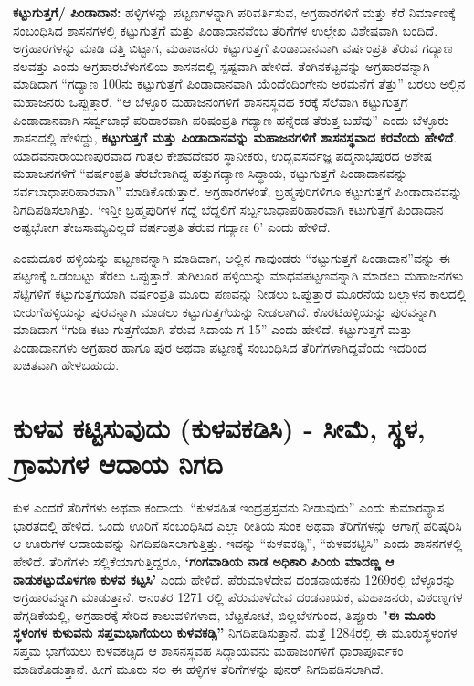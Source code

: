 \textbf{ಕಟ್ಟುಗುತ್ತಗೆ/ ಪಿಂಡಾದಾನ:} ಹಳ್ಳಿಗಳನ್ನು ಪಟ್ಟಣಗಳನ್ನಾಗಿ ಪರಿವರ್ತಿಸುವ, ಅಗ್ರಹಾರಗಳಿಗೆ ಮತ್ತು ಕೆರೆ ನಿರ್ಮಾಣಕ್ಕೆ ಸಂಬಂಧಿಸಿದ ಶಾಸನಗಳಲ್ಲಿ ಕಟ್ಟುಗುತ್ತಗೆ ಮತ್ತು ಪಿಂಡಾದಾನವೆಂಬ ತೆರಿಗೆಗಳ ಉಲ್ಲೇಖ ವಿಶೇಷವಾಗಿ ಬಂದಿದೆ. ಅಗ್ರಹಾರಗಳನ್ನು ಮಾಡಿ ದತ್ತಿ ಬಿಟ್ಟಾಗ, ಮಹಾಜನರು ಕಟ್ಟುಗುತ್ತಗೆ ಪಿಂಡಾದಾನವಾಗಿ ವರ್ಷಂಪ್ರತಿ ತೆರುವ ಗದ್ಯಾಣ ನಲವತ್ತು ಎಂದು ಅಗ್ರಹಾರಬೆಳುಗಲಿಯ ಶಾಸನದಲ್ಲಿ ಸ್ಪಷ್ಟವಾಗಿ ಹೇಳಿದೆ. ತೆಂಗಿನಕಟ್ಟವನ್ನು ಅಗ್ರಹಾರವನ್ನಾಗಿ ಮಾಡಿದಾಗ “ಗದ್ಯಾಣ 100ನು ಕಟ್ಟುಗುತ್ತಗೆ ಪಿಂಡಾದಾನವಾಗಿ ಯೆಂದೆಂದಿಂಗೇನು ಅರಮನೆಗೆ ತೆತ್ತು” ಬರಲು ಅಲ್ಲಿನ ಮಹಾಜನರು ಒಪ್ಪುತ್ತಾರೆ. “ಆ ಬೆಳ್ಳೂರ ಮಹಾಜನಂಗಳಿಗೆ ಶಾಸನಸ್ಥವಹ ಕರಕ್ಕೆ ಸೆಲೆವಾಗಿ ಕಟ್ಟುಗುತ್ತಗೆ ಪಿಂಡಾದಾನವಾಗಿ ಸರ್ವ್ವಬಾಧೆ ಪರಿಹಾರವಾಗಿ ಪರಿಷಂಪ್ರತಿ ಗದ್ಯಾಣ ಹನ್ನೆರಡ ತೆರುತ್ತ ಬಹೆವು” ಎಂದು ಬೆಳ್ಳೂರು ಶಾಸನದಲ್ಲಿ ಹೇಳಿದ್ದು, \textbf{ಕಟ್ಟುಗುತ್ತಗೆ ಮತ್ತು ಪಿಂಡಾದಾನವನ್ನು ಮಹಾಜನಗಳಿಗೆ ಶಾಸನಸ್ಥವಾದ ಕರವೆಂದು ಹೇಳಿದೆ}. ಯಾದವನಾರಾಯಣಪುರವಾದ ಗುತ್ತಲ ಕೇಶವದೇವರ ಸ್ಥಾನೀಕರು, ಉದ್ಭವಸರ್ವಜ್ಞ ಪದ್ಮನಾಭಪುರದ ಅಶೇಷ ಮಹಾಜನಗಳಿಗೆ “ವರ್ಷಂಪ್ರತಿ ತೆರಬೇಕಾಗಿದ್ದ ಹತ್ತುಗದ್ಯಾಣ ಸಿದ್ಧಾಯ, ಕಟ್ಟುಗುತ್ತಗೆ ಪಿಂಡಾದಾನವನ್ನು ಸರ್ವಬಾಧಾಪರಿಹಾರವಾಗಿ” ಮಾಡಿಕೊಡುತ್ತಾರೆ. ಅಗ್ರಹಾರಗಳಂತೆ, ಬ್ರಹ್ಮಪುರಿಗಳಿಗೂ ಕಟ್ಟುಗುತ್ತಗೆ ಪಿಂಡಾದಾನವನ್ನು ನಿಗದಿಪಡಿಸಲಾಗಿತ್ತು. ‘ಇನ್ತೀ ಬ್ರಹ್ಮಪುರಿಗಳ ಗದ್ದೆ ಬೆದ್ದಲಿಗೆ ಸರ್ಬ್ಬಬಾಧಾಪರಿಹಾರವಾಗಿ ಕಟುಗುತ್ತಗೆ ಪಿಂಡಾದಾನ ಅಷ್ಟಭೋಗ ತೇಜಸಾಮ್ಯವಿಲ್ಲದೆ ವರ್ಷಂಪ್ರತಿ ತೆರುವ ಗದ್ಯಾಣ 6’ ಎಂದು ಹೇಳಿದೆ.

ಎಂಮದೂರ ಹಳ್ಳಿಯನ್ನು ಪಟ್ಟಣವನ್ನಾಗಿ ಮಾಡಿದಾಗ, ಅಲ್ಲಿನ ಗಾವುಂಡರು “ಕಟ್ಟುಗುತ್ತಗೆ ಪಿಂಡಾದಾನ”ವನ್ನು ಈ ಪಟ್ಟಣಕ್ಕೆ ಒಡಂಬಟ್ಟು ತೆರಲು ಒಪ್ಪುತ್ತಾರೆ. ತುಗಿಲೂರ ಹಳ್ಳಿಯನ್ನು ಮಾಧವಪಟ್ಟಣವನ್ನಾಗಿ ಮಾಡಲು ಮಹಾಜನಗಳು ಸೆಟ್ಟಿಗಳಿಗೆ ಕಟ್ಟುಗುತ್ತಗೆಯಾಗಿ ವರ್ಷಂಪ್ರತಿ ಮೂರು ಪಣವನ್ನು ನೀಡಲು ಒಪ್ಪುತ್ತಾರೆ ಮೂರನೆಯ ಬಲ್ಲಾಳನ ಕಾಲದಲ್ಲಿ ಬೀರುಗೆಹಳ್ಳಿಯನ್ನು ಪುರವನ್ನಾಗಿ ಮಾಡಲು ಕಟ್ಟುಗುತ್ತಗೆಯನ್ನು ನೀಡಲಾಗಿದೆ. ಕೊರಟಿಹಳ್ಳಿಯನ್ನು ಪುರವನ್ನಾಗಿ ಮಾಡಿದಾಗ “ಗುಡಿ ಕಟು ಗುತ್ತಗೆಯಾಗಿ ತೆರುವ ಸಿದಾಯ ಗ 15” ಎಂದು ಹೇಳಿದೆ. ಕಟ್ಟುಗುತ್ತಗೆ ಮತ್ತು ಪಿಂಡಾದಾನಗಳು ಅಗ್ರಹಾರ ಹಾಗೂ ಪುರ ಅಥವಾ ಪಟ್ಟಣಕ್ಕೆ ಸಂಬಂಧಿಸಿದ ತೆರಿಗೆಗಳಾಗಿದ್ದವೆಂದು ಇದರಿಂದ ಖಚಿತವಾಗಿ ಹೇಳಬಹುದು.


\section{ಕುಳವ ಕಟ್ಟಿಸುವುದು (ಕುಳವಕಡಿಸಿ) - ಸೀಮೆ, ಸ್ಥಳ, ಗ್ರಾಮಗಳ ಆದಾಯ ನಿಗದಿ}

ಕುಳ ಎಂದರೆ ತೆರಿಗೆಗಳು ಅಥವಾ ಕಂದಾಯ. “ಕುಳಸಹಿತ ಇಂದ್ರಪ್ರಸ್ತವನು ನೀಡುವುದು” ಎಂದು ಕುಮಾರವ್ಯಾಸ ಭಾರತದಲ್ಲಿ ಹೇಳಿದೆ. ಒಂದು ಊರಿಗೆ ಸಂಬಂಧಿಸಿದ ಎಲ್ಲಾ ರೀತಿಯ ಸುಂಕ ಅಥವಾ ತೆರಿಗೆಗಳನ್ನು ಆಗಾಗ್ಗೆ ಪರಿಷ್ಕರಿಸಿ ಆ ಊರುಗಳ ಆದಾಯವನ್ನು ನಿಗದಿಪಡಿಸಲಾಗುತ್ತಿತ್ತು. ಇದನ್ನು “ಕುಳವಕಡ್ಸಿ”, “ಕುಳವಕಟ್ಟಿಸಿ” ಎಂದು ಶಾಸನಗಳಲ್ಲಿ ಹೇಳಿದೆ. ತೆರಿಗೆಗಳು ಸಲ್ಲಿಕೆಯಾಗುತ್ತಿದ್ದರೂ, \textbf{‘ಗಂಗವಾಡಿಯ ನಾಡ ಅಧಿಕಾರಿ ಪಿರಿಯ ಮಾದಣ್ಣ ಆ ನಾಡುಕಟ್ಟುದೊಳಗಣ ಕುಳವ ಕಟ್ಟಸಿ’} ಎಂದು ಹೇಳಿದೆ. ಪೆರುಮಾಳೆದೇವ ದಂಡನಾಯಕನು 1269ರಲ್ಲಿ ಬೆಳ್ಳೂರನ್ನು ಅಗ್ರಹಾರವನ್ನಾಗಿ ಮಾಡುತ್ತಾನೆ. ಆನಂತರ 1271 ರಲ್ಲಿ ಪೆರುಮಾಳೆದೇವ ದಂಡನಾಯಕ, ಮಹಾಜನರು, ವಿಠಂಣ್ನಗಳ ಹೆಗ್ಗಡಿಕೆಯಲ್ಲಿ, ಅಗ್ರಹಾರಕ್ಕೆ ಸೇರಿದ ಕಾಲುವಳಿಗಳಾದ, ಬೆಟ್ಟಕೋಟೆ, ಬಿಲ್ಲಬೆಳಗುಂದ, ತಿಪ್ಪೂರು \textbf{"ಈ ಮೂರು ಸ್ಥಳಂಗಳ ಕುಳುವನು ಸಪ್ತಮಭಾಗೆಯಲು ಕುಳವಕಡ್ಸಿ”} ನಿಗದಿಪಡಿಸುತ್ತಾನೆ. ಮತ್ತೆ 1284ರಲ್ಲಿ ಈ ಮೂರುಸ್ಥಳಂಗಳ ಸಪ್ತಮ ಭಾಗೆಯಲು ಕುಳವಕಡ್ಸಿದ ಆ ಶಾಸನಸ್ಥವಹ ಸಿದ್ಧಾಯವನು ಮಹಾಜಂಗಳಿಗೆ ಧಾರಾಪೂರ್ವಕಂ ಮಾಡಿಕೊಡುತ್ತಾನೆ. ಹೀಗೆ ಮೂರು ಸಲ ಈ ಹಳ್ಳಿಗಳ ತೆರಿಗೆಗಳನ್ನು ಪುನರ್​ ನಿಗದಿಪಡಿಸಲಾಗಿದೆ.

